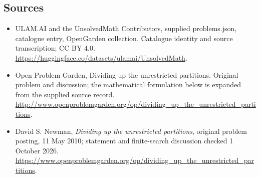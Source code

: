 \documentclass[11pt,a4paper]{article}
\begin{document}
\subsection{Sources}
\begin{itemize}
\item[S1] ULAM.AI and the UnsolvedMath Contributors, supplied problems.json, catalogue entry, OpenGarden collection. Catalogue identity and source transcription; CC BY 4.0.
\url{https://huggingface.co/datasets/ulamai/UnsolvedMath}.
\item[S2] Open Problem Garden, Dividing up the unrestricted partitions. Original problem and discussion; the mathematical formulation below is expanded from the supplied source record.
\url{http://www.openproblemgarden.org/op/dividing_up_the_unrestricted_partitions}.

\item[R1] David S. Newman, \emph{Dividing up the unrestricted
partitions}, original problem posting, 11 May 2010; statement and
finite-search discussion checked 1 October 2026.
\url{https://www.openproblemgarden.org/op/dividing_up_the_unrestricted_partitions}.

\end{itemize}
\end{document}
